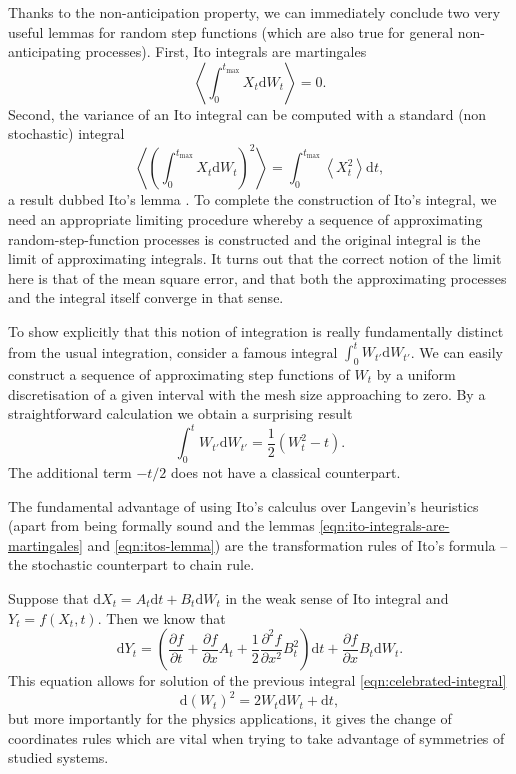 \documentclass{doctoral}
\newcommand{\pd}{\partial}
\newcommand{\dd}{\mathrm{d}}
\begin{document}
Thanks to the non-anticipation property, we can immediately conclude two very useful lemmas for random step functions (which are also true for general non-anticipating processes).
First, Ito integrals are martingales
\begin{equation}
    \left< \int_0^{t_{\mathrm{max}}} X_t \dd W_t \right> = 0.
    \label{eqn:ito-integrals-are-martingales}
\end{equation}
Second, the variance of an Ito integral can be computed with a standard (non stochastic) integral
\begin{equation}
    \left< \left( \int_0^{t_{\mathrm{max}}} X_t \dd W_t \right)^2 \right> = \int_{0}^{t_{\mathrm{max}}} \left< X_t^2 \right> \dd t, \label{eqn:itos-lemma}
\end{equation}
a result dubbed Ito's lemma \cite{Ito_1951}.
To complete the construction of Ito's integral, we need an appropriate limiting procedure whereby a sequence of approximating random-step-function processes is constructed and the original integral is the limit of approximating integrals.
It turns out that the correct notion of the limit here is that of the mean square error, and that both the approximating processes and the integral itself converge in that sense.

To show explicitly that this notion of integration is really fundamentally distinct from the usual integration, consider a famous integral $\int_0^t W_{t'} \dd W_{t'}$.
We can easily construct a sequence of approximating step functions of $W_{t}$ by a uniform discretisation of a given interval with the mesh size approaching to zero.
By a straightforward calculation we obtain a surprising result
\begin{equation}
    \int_{0}^{t} W_{t'} \dd W_{t'} = \frac{1}{2} \left( W_t^2 - t \right).
    \label{eqn:celebrated-integral}
\end{equation}
The additional term $-t/2$ does not have a classical counterpart.

The fundamental advantage of using Ito's calculus over Langevin's heuristics (apart from being formally sound and the lemmas \eqref{eqn:ito-integrals-are-martingales} and \eqref{eqn:itos-lemma}) are the transformation rules of Ito's formula -- the stochastic counterpart to chain rule.

Suppose that $\dd X_t = A_t \dd t + B_t \dd W_t$ in the weak sense of Ito integral and $Y_t = f(X_t,t)$.
Then we know that
\begin{equation}
    \dd Y_t = \left( \frac{\pd f}{\pd t} + \frac{\pd f}{\pd x} A_t + \frac{1}{2} \frac{\pd^2 f}{\pd x^2} B_t^2 \right) \dd t + \frac{\pd f}{\pd x} B_t \dd W_t.
    \label{eqn:itos-formula}
\end{equation}
This equation allows for solution of the previous integral \eqref{eqn:celebrated-integral}
\begin{equation}
    \dd (W_t)^2 = 2 W_t \dd W_t + \dd t, \label{eqn:ito-formula-applied}
\end{equation}
but more importantly for the physics applications, it gives the change of coordinates rules which are vital when trying to take advantage of symmetries of studied systems.
\end{document}
